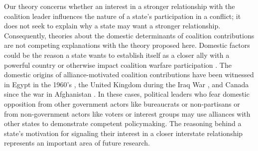 \documentclass[12pt,letterpaper]{article}
\begin{document}
		Our theory concerns whether an interest in a stronger relationship with the coalition leader influences the nature of a state's participation in a conflict; it does not seek to explain why a state may want a stronger relationship. Consequently, theories about the domestic determinants of coalition contributions are not competing explanations with the theory proposed here. Domestic factors could be the reason a state wants to establish itself as a closer ally with a powerful country \citep{tago_whenaredemocratic_2009, pilster_aredemocraciesbetter_2011, wolford_nationalleaderspolitical_2016} or otherwise impact coalition warfare participation \citep{baum_iraqcoalitionwilling_2013}. The domestic origins of alliance-motivated coalition contributions have been witnessed in Egypt in the 1960's \citep{barnett_domesticsourcesalliances_1991}, the United Kingdom during the Iraq War \citep{davidson_americaallieswar_2011}, and Canada since the war in Afghanistan \citep{massie_alliancevaluestatus_2018, mckay_whycanadabest_2018}. In these cases, political leaders who fear domestic opposition from other government actors like bureaucrats or non-partisans or from non-government actors like voters or interest groups may use alliances with other states to demonstrate competent policymaking. The reasoning behind a state's motivation for signaling their interest in a closer interstate relationship represents an important area of future research.
		
\end{document}
